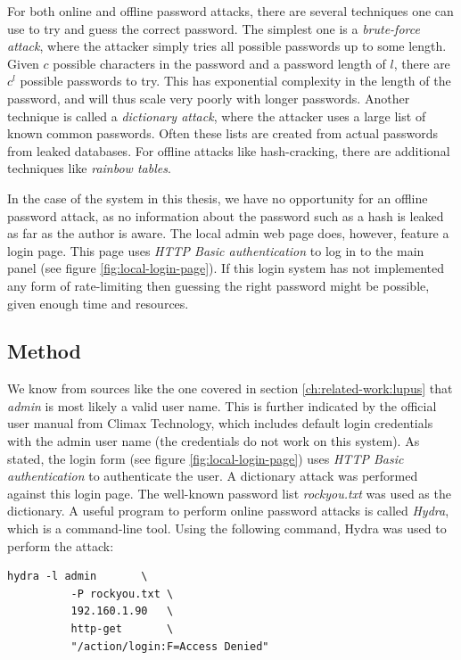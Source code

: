 For both online and offline password attacks, there are several techniques one can use to try and guess the correct password. The simplest one is a \textit{brute-force attack}, where the attacker simply tries all possible passwords up to some length. Given $c$ possible characters in the password and a password length of $l$, there are $c^l$ possible passwords to try. This has exponential complexity in the length of the password, and will thus scale very poorly with longer passwords. Another technique is called a \textit{dictionary attack}, where the attacker uses a large list of known common passwords. Often these lists are created from actual passwords from leaked databases. For offline attacks like hash-cracking, there are additional techniques like \textit{rainbow tables}.

In the case of the system in this thesis, we have no opportunity for an offline password attack, as no information about the password such as a hash is leaked as far as the author is aware. The local admin web page does, however, feature a login page. This page uses \textit{HTTP Basic authentication} to log in to the main panel (see figure \ref{fig:local-login-page}). If this login system has not implemented any form of rate-limiting then guessing the right password might be possible, given enough time and resources.

\subsection{Method}
We know from sources like the one covered in section \ref{ch:related-work:lupus} that \textit{admin} is most likely a valid user name. This is further indicated by the official user manual from Climax Technology, which includes default login credentials with the admin user name (the credentials do not work on this system). As stated, the login form (see figure \ref{fig:local-login-page}) uses \textit{HTTP Basic authentication} to authenticate the user. A dictionary attack was performed against this login page. The well-known password list \textit{rockyou.txt} was used as the dictionary. A useful program to perform online password attacks is called \textit{Hydra}, which is a command-line tool. Using the following command, Hydra was used to perform the attack:
\begin{lstlisting}[frame=tb]
    hydra -l admin       \
          -P rockyou.txt \
          192.160.1.90   \
          http-get       \
          "/action/login:F=Access Denied"
\end{lstlisting}

